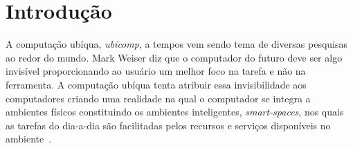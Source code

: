 
\chapter{Introdução}
	
A computação ubíqua, \textit{ubicomp}, a tempos vem sendo tema de diversas pesquisas ao redor do mundo. Mark Weiser diz que o computador do futuro deve ser algo invisível \cite{weiser1, weiser2} proporcionando ao usuário um melhor foco na tarefa e não na ferramenta. A computação ubíqua tenta atribuir essa invisibilidade aos computadores criando uma realidade na qual o computador se integra a ambientes físicos constituindo os ambientes inteligentes, \textit{smart-spaces}, nos quais as tarefas do dia-a-dia são facilitadas pelos recursos e serviços disponíveis no ambiente~\cite{alegomes,weiser1, weiser2}.







